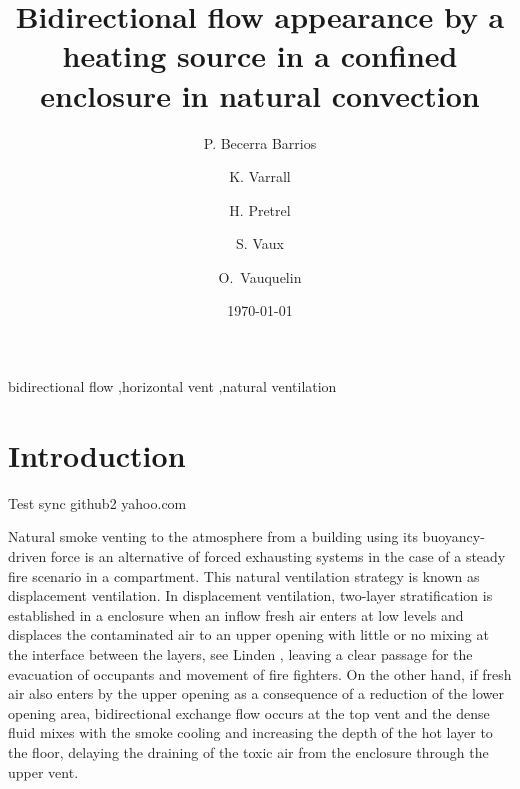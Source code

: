 \documentclass[preprint,12pt]{elsarticle}
\date{\today}
\title{}
\begin{document}
\begin{frontmatter}

\title{Bidirectional flow appearance by a heating source in a confined
  enclosure in natural convection}

\author[label1,label3]{P. Becerra Barrios}

\address[label1]{Laboratoire IUSTI, UMR CNRS 7343, Aix-Marseille Université, \mbox{5 rue Enrico Fermi, 13453 Marseille, France}}
\address[label2]{ \mbox{Institut de Radioprotection et de Sûreté
    Nucléaire (PSN-RES/SA2I)}, \mbox{Centre de Cadarache, 13115 Saint-Paul-Lez-Durance}, France}
\address[label3]{School of Mechanical Engineering, University of Costa Rica, Costa Rica} 

\author[label1]{K. Varrall}

\author[label2]{H. Pretrel}

\author[label2]{S. Vaux}

\author[label1]{\mbox{O. Vauquelin}}

\begin{abstract}


\end{abstract}

\begin{keyword}
bidirectional flow \sep horizontal vent \sep natural ventilation
\end{keyword}

\end{frontmatter}

\linenumbers

\section{Introduction}
\label{sec:org50e52e7}

Test sync github2 yahoo.com

Natural smoke venting to the atmosphere from a building using its buoyancy-driven force is an alternative of forced exhausting systems in the case of a steady fire scenario in a compartment. This natural ventilation strategy is known as displacement ventilation. In displacement ventilation, two-layer stratification is established in a enclosure when an inflow fresh air enters at low levels and displaces the contaminated air to an upper opening with little or no mixing at the interface between the layers, see Linden \cite{linden_1999}, leaving a clear passage for the evacuation of occupants and movement of fire fighters. On the other hand, if fresh air also enters by the upper opening as a consequence of a reduction of the lower opening area, bidirectional exchange flow occurs at the top vent and the dense fluid mixes with the smoke cooling and increasing the depth of the hot layer to the floor, delaying the draining of the toxic air from the enclosure through the upper vent.
\end{document}
